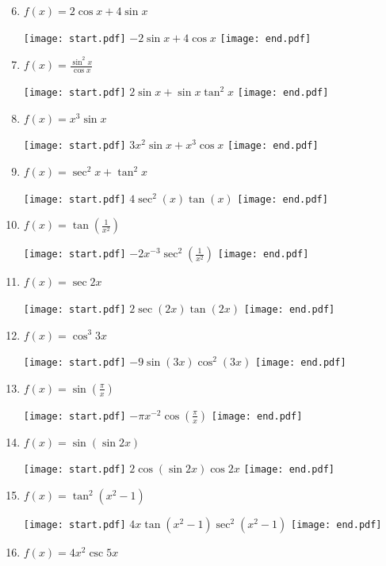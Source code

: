 \documentclass[12pt]{article}
\begin{document}
\begin{enumerate}
\setcounter{enumi}{5}

\item $f(x) = 2\cos{x}+4\sin{x}$ 

\texttt{[image: start.pdf]}
{{$-2\sin{x}+4\cos{x}$}}
\texttt{[image: end.pdf]}


\item $f(x) = \frac{\sin^2{x}}{\cos{x}}$ 

\texttt{[image: start.pdf]}
{{$2\sin{x}+\sin{x}\tan^{2}{x} $}}
\texttt{[image: end.pdf]}


\item $f(x) = x^3\sin{x}$ 

\texttt{[image: start.pdf]}
{{$3x^2\sin{x}+x^3\cos{x}$}}
\texttt{[image: end.pdf]}


\item $f(x) = \sec^2{x}+\tan^2{x}$ 

\texttt{[image: start.pdf]}
{{$4\sec^2{(x)}\tan{(x)}$}}
\texttt{[image: end.pdf]}


\item $f(x) = \tan{\left(\frac{1}{x^2}\right)}$ 

\texttt{[image: start.pdf]}
{{$-2x^{-3}\sec^2{\left(\frac{1}{x^2}\right)}$}}
\texttt{[image: end.pdf]}


\item $f(x) = \sec{2x}$ 

\texttt{[image: start.pdf]}
{{$2\sec{(2x)}\tan{(2x)}$}}
\texttt{[image: end.pdf]}


\item $f(x) = \cos^3{3x}$ 

\texttt{[image: start.pdf]}
{{$-9\sin{(3x)}\cos^2{(3x)}$}}
\texttt{[image: end.pdf]}


\item $f(x) = \sin {\left(\frac{\pi}{x}\right)}$ 

\texttt{[image: start.pdf]}
{{$-\pi x^{-2}\cos{\left(\frac{\pi}{x}\right)}$}}
\texttt{[image: end.pdf]}


\item $f(x) = \sin{(\sin{2x})}$ 

\texttt{[image: start.pdf]}
{{$2\cos{(\sin{2x})}\cos{2x}$}}
\texttt{[image: end.pdf]}


\item $f(x) = \tan^2{(x^2-1)}$ 

\texttt{[image: start.pdf]}
{{$4x\tan{(x^2-1)}\sec^2{(x^2-1)}$}}
\texttt{[image: end.pdf]}


\item $f(x)=4x^2\csc{5x}$


\end{enumerate}
\end{document}
